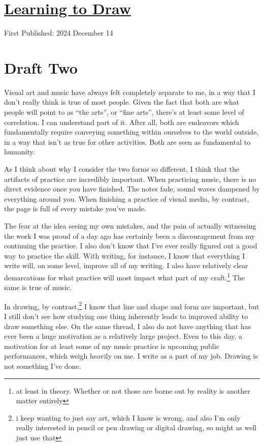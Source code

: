\documentclass[12pt]{article}[titlepage]
\newcommand{\say}[1]{``#1''}
\renewcommand{\,}{\textsuperscript{,}}
\begin{document}
\doublespacing
\section{\href{learning-drawing.html}{Learning to Draw}}
First Published: 2024 December 14
\section{Draft Two}

Visual art and music have always felt completely separate to me, in a way that I don't really think is true of most people.  
Given the fact that both are what people will point to as \say{the arts}, or \say{fine arts}, there's at least some level of correlation.  
I can understand part of it.  
After all, both are endeavors which fundamentally require conveying something within ourselves to the world outside, in a way that isn't as true for other activities.  
Both are seen as fundamental to humanity.

As I think about why I consider the two forms so different, I think that the artifacts of practice are incredibly important.  
When practicing music, there is no direct evidence once you have finished.  
The notes fade, sound waves dampened by everything around you.  
When finishing a practice of visual media, by contrast, the page is full of every mistake you've made.

The fear at the idea seeing my own mistakes, and the pain of actually witnessing the work I was proud of a day ago has certainly been a discouragement from my continuing the practice.  
I also don't know that I've ever really figured out a good way to practice the skill.  
With writing, for instance, I know that everything I write will, on some level, improve all of my writing.  
I also have relatively clear demarcations for what practice will most impact what part of my craft.\footnote{at least in theory. Whether or not those are borne out by reality is another matter entirely}  
The same is true of music.

In drawing, by contrast,\footnote{i keep wanting to just say art, which I know is wrong, and also I'm only really interested in pencil or pen drawing or digital drawing, so might as well just use that} I know that line and shape and form are important, but I still don't see how studying one thing inherently leads to improved ability to draw something else.  
On the same thread, I also do not have anything that has ever been a huge motivation as a relatively large project.  
Even to this day, a motivation for at least some of my music practice is upcoming public performances, which weigh heavily on me.  
I write as a part of my job.  
Drawing is not something I've done.
\end{document}
